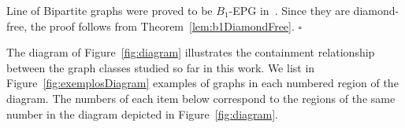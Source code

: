\documentclass[9pt]{entcs}
\begin{document}
\begin{pf}
Line of Bipartite graphs were proved to be $B_1$-EPG in~\cite{golumbic2018edge}. Since they are diamond-free, the proof follows from Theorem~\ref{lem:b1DiamondFree}.
$\square$
\end{pf}

The diagram of Figure~\ref{fig:diagram}
illustrates the containment relationship between the graph classes  studied so far in this work. 
We list in Figure~\ref{fig:exemplosDiagram} examples of graphs in each numbered region of the diagram. The numbers of each item below correspond to the regions of the same number in the diagram depicted in Figure~\ref{fig:diagram}.

\end{document}
